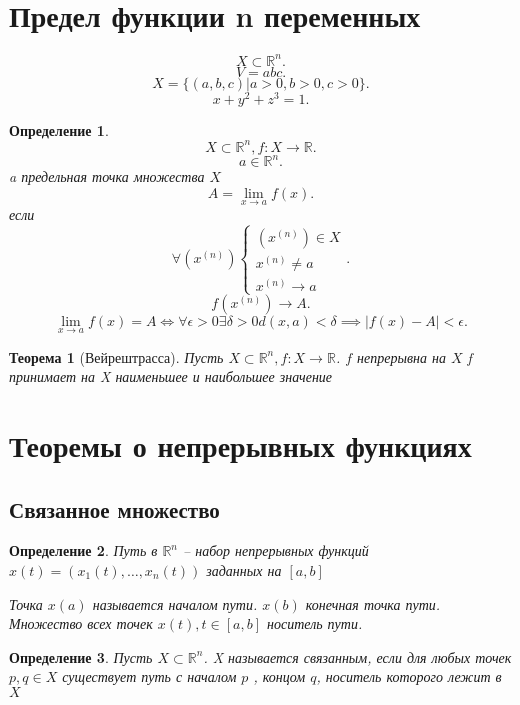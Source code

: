 \documentclass[14pt]{extarticle} \usepackage{fontspec}
\newtheorem{theorem}{Теорема}
\newtheorem{definition}{Определение}
\begin{document}
\section{Предел функции n переменных}
\[
X \subset \mathbb{R}^{n}
.\] 
\[
V = abc
.\] 
\[
    X = \{ (a,b,c) | a>0,b>0,c>0\}
.\] 
\[
x + y^{2} + z^{3} = 1
.\] 
\begin{definition}
    \[
    X \subset \mathbb{R}^{n}, f : X \to \mathbb{R}
    .\] 
    \[
    a \in \mathbb{R}^{n}
    .\] 
    a предельная точка множества $X$
     \[
    A = \lim_{x \to a} f(x)
    .\] 
    если
    \[
    \forall  (x^{(n)}) 
    \begin{cases}
        (x^{(n)}) \in X\\
        x^{(n)} \neq a\\
        x^{(n)} \to a
    \end{cases}
    .\] 
    \[
    f(x^{(n)}) \to A
    .\] 
    \[
    \lim_{x \to a} f(x) = A \iff \forall  \epsilon > 0 \exists  \delta >0 d(x,a) < \delta \implies |f(x) - A| < \epsilon
    .\] 
\end{definition}
\begin{theorem}[Вейрештрасса]
    Пусть $X \subset \mathbb{R}^{n}, f : X \to \mathbb{R}$. $f$ непрерывна на $X$ 
    f принимает на X наименьшее и наибольшее значение
\end{theorem}
\section{Теоремы о непрерывных функциях}
\subsection{Связанное множество}
\begin{definition}
    Путь в $\mathbb{R}^{n}$ -- набор непрерывных функций $x(t) = ( x_1(t),\dots,x_{n}(t) )$ 
    заданных на $[a,b]$
    
    Точка $x(a)$ называется началом пути.  $x(b)$ конечная точка пути. Множество всех точек $x(t), t \in [a,b]$ носитель пути.
\end{definition}
\begin{definition}
    Пусть $X \subset \mathbb{R}^{n}$. X называется связанным, если для любых точек
    $p,q \in X$ существует путь с началом  $p$ , концом  $q$, носитель которого лежит в $X$
\end{definition}
\end{document}
